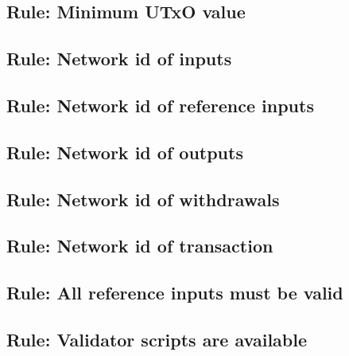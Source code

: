 \documentclass[../midgard.tex]{subfiles}
\begin{document}
\subsection{Rule: Minimum UTxO value}
\label{rule:minimum-utxo-value}

\subsection{Rule: Network id of inputs}
\label{rule:network-id-of-inputs}

\subsection{Rule: Network id of reference inputs}
\label{rule:network-id-of-reference-inputs}


\subsection{Rule: Network id of outputs}
\label{rule:network-id-of-outputs}

\subsection{Rule: Network id of withdrawals}
\label{rule:network-id-of-withdrawals}

\subsection{Rule: Network id of transaction}
\label{rule:network-id-of-transaction}

\subsection{Rule: All reference inputs must be valid}
\label{rule:all-reference-inputs-must-be-valid}


\subsection{Rule: Validator scripts are available}
\label{rule:validator-scripts-are-available}

\end{document}
